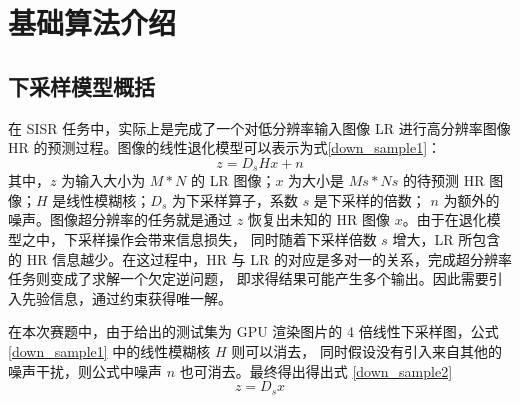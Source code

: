 \documentclass[12pt, a4paper, oneside]{ctexbook}
\begin{document}
	\section{基础算法介绍}
	\subsection{下采样模型概括}
	在 SISR 任务中，实际上是完成了一个对低分辨率输入图像 LR 进行高分辨率图像 HR 的预测过程。图像的线性退化模型可以表示为式\ref{down_sample1}：
	\begin{equation}
		z=D_sHx + n \label{down_sample1}
	\end{equation}
	其中，$z$ 为输入大小为 $M*N$ 的 LR 图像；$x$ 为大小是 $Ms*Ns$ 的待预测 HR 图像；$H$ 是线性模糊核；$D_s$ 为下采样算子，系数 $s$ 是下采样的倍数； 
	$n$ 为额外的噪声。图像超分辨率的任务就是通过 $z$ 恢复出未知的 HR 图像 $x$。由于在退化模型之中，下采样操作会带来信息损失，
	同时随着下采样倍数 $s$ 增大，LR 所包含的 HR 信息越少。在这过程中，HR 与 LR 的对应是多对一的关系，完成超分辨率任务则变成了求解一个欠定逆问题，
	即求得结果可能产生多个输出。因此需要引入先验信息，通过约束获得唯一解。
	\par 在本次赛题中，由于给出的测试集为 GPU 渲染图片的 4 倍线性下采样图，公式 \ref{down_sample1} 中的线性模糊核 $H$ 则可以消去，
	同时假设没有引入来自其他的噪声干扰，则公式中噪声 $n$ 也可消去。最终得出得出式 \ref{down_sample2}
	\begin{equation}
		z=D_sx \label{down_sample2}
	\end{equation}
	
\end{document}
